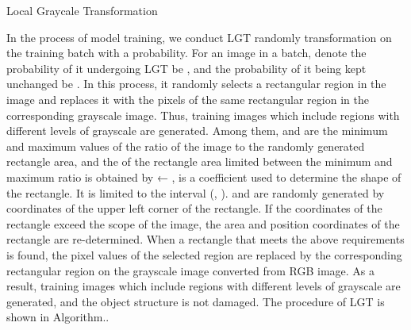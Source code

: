 \documentclass[10pt,twocolumn,letterpaper]{article}
\begin{document}
\begin{algorithm}[t]
	\SetAlgoLined
	\caption{Local Graycale Transformation}\label{algorithm 2}
	
\end{algorithm}
In the process of model training, we conduct LGT randomly transformation on the training batch with a probability. For an image  in a batch, denote the probability of it undergoing LGT be , and the probability of it being kept unchanged be . In this process, it randomly selects a rectangular region in the image and replaces it with the pixels of the same rectangular region in the corresponding grayscale image. Thus, training images which include regions with different levels of grayscale are generated. Among them,  and  are the minimum and maximum values of the ratio of the image to the randomly generated rectangle area, and the  of the rectangle area limited between the minimum and maximum ratio is obtained by  ← ,  is a coefficient used to determine the shape of the rectangle. It is limited to the interval (,  ).  and  are randomly generated by coordinates of the upper left corner of the rectangle. If the coordinates of the rectangle exceed the scope of the image, the area and position coordinates of the rectangle are re-determined. When a rectangle that meets the above requirements is found, the pixel values of the selected region are replaced by the corresponding rectangular region on the grayscale image converted from RGB image. As a result, training images which include regions with different levels of grayscale are generated, and the object structure is not damaged. The procedure of LGT is shown in Algorithm..
\end{document}
